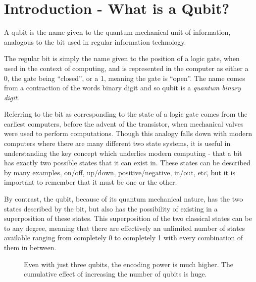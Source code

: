 
\section{Introduction - What is a Qubit?}
A qubit is the name given to the quantum mechanical unit of information, analogous to the bit used in regular information technology\cite{gentleintro}.

The regular bit is simply the name given to the position of a logic gate, when used in the context of computing, and is represented in the computer as either a 0, the gate being ``closed'', or a 1, meaning the gate is ``open''. The name comes from a contraction of the words binary digit and so qubit is a \emph{quantum binary digit}. 

Referring to the bit as corresponding to the state of a logic gate comes from the earliest computers, before the advent of the transistor, when mechanical valves were used to perform computations. Though this analogy falls down with modern computers where there are many different two state systems, it is useful in understanding the key concept which underlies modern computing - that a bit has exactly two possible states that it can exist in. These states can be described by many examples, on/off, up/down, positive/negative, in/out, etc\., but it is important to remember that it must be one or the other.

By contrast, the qubit, because of its quantum mechanical nature, has the two states described by the bit, but also has the possibility of existing in a superposition of these states. This superposition of the two classical states can be to any degree, meaning that there are effectively an unlimited number of states available ranging from completely 0 to completely 1 with every combination of them in between. 

\begin{figure}[h]
	\centering
	 \label{fig:spring}
	\caption{Even with just three qubits, the encoding power is much higher. The cumulative effect of increasing the number of qubits is huge.}
\end{figure}
